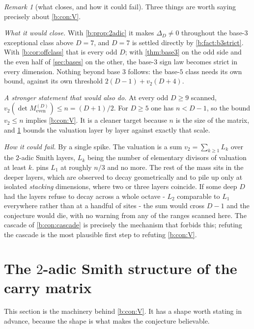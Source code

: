 \documentclass[11pt]{amsart}
\theoremstyle{definition}
\theoremstyle{remark}
\newtheorem{remark}[theorem]{Remark}
\begin{document}
\begin{remark}[what closes, and how it could fail]
\label{b:rem:V}
Three things are worth saying precisely about \cref{b:con:V}.

\emph{What it would close.} With \cref{b:prop:2adic} it makes $\Delta_D \ne 0$ throughout the base-$3$ exceptional class above $D = 7$, and $D = 7$ is settled directly by \cref{b:fact:b3strict}. With \cref{b:cor:offclass} that is every odd $D$; with \cref{thm:base3} on the odd side and the even half of \cref{sec:bases} on the other, the base-$3$ sign law becomes strict in every dimension. Nothing beyond base $3$ follows: the base-$5$ class needs its own bound, against its own threshold $2(D-1) + v_2(D+4)$.

\emph{A stronger statement that would also do.} At every odd $D \ge 9$ scanned, $v_2(\det M_{\mathrm{even}}^{(D)}) \le n = (D+1)/2$. For $D \ge 5$ one has $n < D-1$, so the bound $v_2 \le n$ implies \cref{b:con:V}. It is a cleaner target because $n$ is the size of the matrix, and \cref{b:sec:smith} bounds the valuation layer by layer against exactly that scale.

\emph{How it could fail.} By a single spike. The valuation is a sum $v_2 = \sum_{k \ge 1} L_k$ over the $2$-adic Smith layers, $L_k$ being the number of elementary divisors of valuation at least $k$.  pins $L_1$ at roughly $n/3$ and no more. The rest of the mass sits in the deeper layers, which are observed to decay geometrically and to pile up only at isolated \emph{stacking} dimensions, where two or three layers coincide. If some deep $D$ had the layers refuse to decay across a whole octave - $L_2$ comparable to $L_1$ everywhere rather than at a handful of sites - the sum would cross $D-1$ and the conjecture would die, with no warning from any of the ranges scanned here. The cascade of \cref{b:con:cascade} is precisely the mechanism that forbids this; refuting the cascade is the most plausible first step to refuting \cref{b:con:V}.
\end{remark}


\section{The $2$-adic Smith structure of the carry matrix}
\label{b:sec:smith}

This section is the machinery behind \cref{b:con:V}. It has a shape worth stating in advance, because the shape is what makes the conjecture believable.
\end{document}
